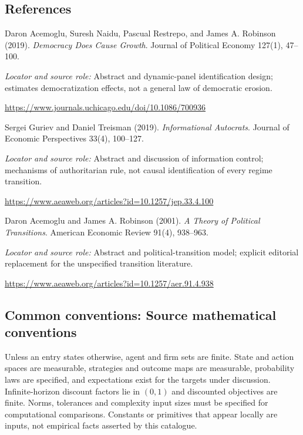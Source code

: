 \documentclass[11pt,a4paper]{article}
\begin{document}
\subsection*{References}
{\footnotesize\raggedright
\begin{enumerate}[label={\textbf{[S\arabic*]}},leftmargin=3em]
\item Daron Acemoglu, Suresh Naidu, Pascual Restrepo, and James A. Robinson (2019). \emph{Democracy Does Cause Growth}. Journal of Political Economy 127(1), 47--100.\par
\textit{Locator and source role:} Abstract and dynamic-panel identification design; estimates democratization effects, not a general law of democratic erosion.\par
\url{https://www.journals.uchicago.edu/doi/10.1086/700936}
\item Sergei Guriev and Daniel Treisman (2019). \emph{Informational Autocrats}. Journal of Economic Perspectives 33(4), 100--127.\par
\textit{Locator and source role:} Abstract and discussion of information control; mechanisms of authoritarian rule, not causal identification of every regime transition.\par
\url{https://www.aeaweb.org/articles?id=10.1257/jep.33.4.100}
\item Daron Acemoglu and James A. Robinson (2001). \emph{A Theory of Political Transitions}. American Economic Review 91(4), 938--963.\par
\textit{Locator and source role:} Abstract and political-transition model; explicit editorial replacement for the unspecified transition literature.\par
\url{https://www.aeaweb.org/articles?id=10.1257/aer.91.4.938}
\end{enumerate}
}

\subsection*{Common conventions: Source mathematical conventions}

Unless an entry states otherwise, agent and firm sets are finite. State and action spaces are measurable, strategies and outcome maps are measurable, probability laws are specified, and expectations exist for the targets under discussion. Infinite-horizon discount factors lie in $(0,1)$ and discounted objectives are finite. Norms, tolerances and complexity input sizes must be specified for computational comparisons. Constants or primitives that appear locally are inputs, not empirical facts asserted by this catalogue.
\end{document}
